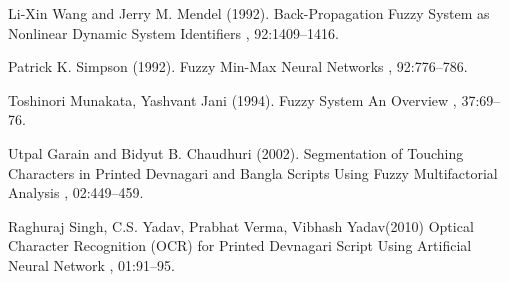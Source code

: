 \documentclass[12pt]{article} %
\begin{document}
\newpage



\begin{thebibliography}{1} %

    \bibitem[1]{}
        Li-Xin Wang and Jerry M. Mendel (1992).
        \newblock Back-Propagation Fuzzy System as Nonlinear Dynamic System Identifiers
        , 92:1409--1416.


    \bibitem[2]{}
        Patrick K. Simpson (1992).
        \newblock Fuzzy Min-Max Neural Networks
        , 92:776--786.


    \bibitem[3]{}
        Toshinori Munakata, Yashvant Jani (1994).
        \newblock Fuzzy System An Overview
        , 37:69--76.


    \bibitem[4]{}
        Utpal Garain and Bidyut B. Chaudhuri (2002).
        \newblock Segmentation of Touching Characters in Printed Devnagari and Bangla Scripts Using Fuzzy Multifactorial Analysis
        , 02:449--459.


    \bibitem[5]{}
        Raghuraj Singh, C.S. Yadav, Prabhat Verma, Vibhash Yadav(2010)
        \newblock Optical Character Recognition (OCR) for Printed Devnagari Script Using Artificial Neural Network
        , 01:91--95.

\end{thebibliography}
\end{document}
